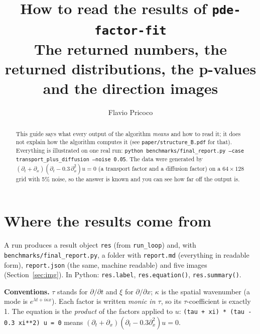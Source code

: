 \documentclass[11pt,a4paper]{article}
\title{How to read the results of \texttt{pde-factor-fit}\\[2pt]\large The returned numbers, the returned distributions, the p-values and the direction images}
\author{Flavio Pricoco}
\date{}
\newcommand{\code}[1]{\texttt{#1}}
\begin{document}
\maketitle
\begin{abstract}\noindent
This guide says what every output of the algorithm \emph{means} and how to read it; it does not explain how the algorithm computes it (see \code{paper/structure\_B.pdf} for that). Everything is illustrated on one real run: \code{python benchmarks/final\_report.py --case transport\_plus\_diffusion --noise 0.05}. The data were generated by $(\partial_t+\partial_x)(\partial_t-0.3\,\partial_x^2)u=0$ (a transport factor and a diffusion factor) on a $64\times128$ grid with 5\% noise, so the answer is known and you can see how far off the output is.
\end{abstract}

\section{Where the results come from}
A run produces a result object \code{res} (from \code{run\_loop}) and, with \code{benchmarks/final\_report.py}, a folder with
\code{report.md} (everything in readable form), \code{report.json} (the same, machine readable) and five images (Section~\ref{sec:img}). In Python: \code{res.label}, \code{res.equation()}, \code{res.summary()}.

\textbf{Conventions.} $\tau$ stands for $\partial/\partial t$ and $\xi$ for $\partial/\partial x$; $\kappa$ is the spatial wavenumber (a mode is $e^{\lambda t+i\kappa x}$). Each factor is written \emph{monic in $\tau$}, so its $\tau$-coefficient is exactly 1. The equation is the \emph{product} of the factors applied to $u$: \code{(tau + xi) * (tau - 0.3 xi**2) u = 0} means $(\partial_t+\partial_x)(\partial_t-0.3\partial_x^2)u=0$.
\end{document}
